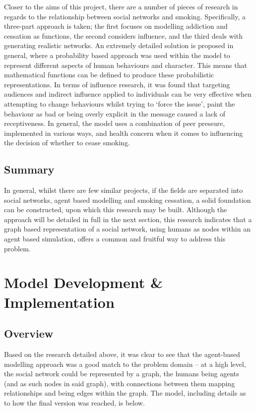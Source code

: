 \documentclass[]{report}
\begin{document}
Closer to the aims of this project, there are a number of pieces of research in regards to the relationship between social networks and smoking\cite{SmokOmni}. Specifically, a three-part approach is taken; the first focuses on modelling addiction and cessation as functions, the second considers influence, and the third deals with generating realistic networks. An extremely detailed solution is proposed in general, where a probability based approach was used within the model to represent different aspects of human behaviours and character\cite{SmokOmni-pap1}. This means that mathematical functions can be defined to produce these probabilistic representations. In terms of influence research, it was found that targeting audiences and indirect influence applied to individuals can be very effective when attempting to change behaviours whilst trying to `force the issue', paint the behaviour as bad or being overly explicit in the message caused a lack of receptiveness\cite{SmokOmni-pap2}. In general, the model uses a combination of peer pressure, implemented in various ways, and health concern when it comes to influencing the decision of whether to cease smoking\cite{SmokOmni-pap3}.

\section{Summary}
In general, whilst there are few similar projects, if the fields are separated into social networks, agent based modelling and smoking cessation, a solid foundation can be constructed, upon which this research may be built. Although the approach will be detailed in full in the next section, this research indicates that a graph based representation of a social network, using humans as nodes within an agent based simulation, offers a common and fruitful way to address this problem.

%
%

%
%
\chapter{Model Development \& Implementation}
\section{Overview}
Based on the research detailed above, it was clear to see that the agent-based modelling approach was a good match to the problem domain – at a high level, the social network could be represented by a graph, the humans being agents (and as such nodes in said graph), with connections between them mapping relationships and being edges within the graph. The model, including details as to how the final version was reached, is below.
\end{document}

